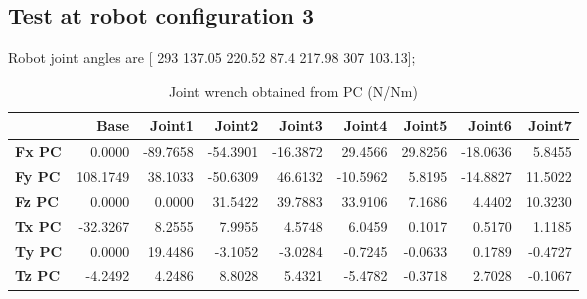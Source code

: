 
\subsection{Test at robot configuration 3}
Robot joint angles are  [ 293        137.05        220.52          87.4        217.98           307        103.13];

\begin{table}[h!]
	\centering
	\caption{Joint wrench obtained from PC (N/Nm)}
	\label{wrech_PC_Pose3}
	\begin{tabular}{|l|r|r|r|r|r|r|r|r|}
		\hline
		\textbf{}  & \textbf{Base} & \textbf{Joint1}  & \textbf{Joint2}  & \textbf{Joint3}  & \textbf{Joint4}  & \textbf{Joint5}  & \textbf{Joint6}  & \textbf{Joint7} \\ \hline
		\textbf{Fx PC}  & 0.0000        & -89.7658        & -54.3901        & -16.3872        & 29.4566        & 29.8256        & -18.0636        & 5.8455 \\ \hline
		\textbf{Fy PC}  & 108.1749        & 38.1033        & -50.6309        & 46.6132        & -10.5962        & 5.8195        & -14.8827        & 11.5022 \\ \hline
		\textbf{Fz PC}  & 0.0000        & 0.0000        & 31.5422        & 39.7883        & 33.9106        & 7.1686        & 4.4402        & 10.3230 \\ \hline
		\textbf{Tx PC}  & -32.3267        & 8.2555        & 7.9955        & 4.5748        & 6.0459        & 0.1017        & 0.5170        & 1.1185 \\ \hline
		\textbf{Ty PC}  & 0.0000        & 19.4486        & -3.1052        & -3.0284        & -0.7245        & -0.0633        & 0.1789        & -0.4727 \\ \hline
		\textbf{Tz PC}  & -4.2492        & 4.2486        & 8.8028        & 5.4321        & -5.4782        & -0.3718        & 2.7028        & -0.1067 \\ \hline
	\end{tabular}
\end{table}

